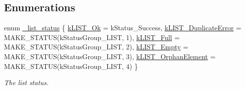 \subsection*{Enumerations}
\begin{DoxyCompactItemize}
\item 
enum \mbox{\hyperlink{group___generic_list_ga803f4a1563b84327f6c4ece67bee52ff}{\+\_\+list\+\_\+status}} \{ \newline
\mbox{\hyperlink{group___generic_list_gga803f4a1563b84327f6c4ece67bee52ffa399f3c85ffa7551e0b398a9549bd0eea}{k\+L\+I\+S\+T\+\_\+\+Ok}} = k\+Status\+\_\+\+Success, 
\mbox{\hyperlink{group___generic_list_gga803f4a1563b84327f6c4ece67bee52ffaba4e0d8373c58275247b212ec1e1cd4b}{k\+L\+I\+S\+T\+\_\+\+Duplicate\+Error}} = M\+A\+K\+E\+\_\+\+S\+T\+A\+T\+US(k\+Status\+Group\+\_\+\+L\+I\+ST, 1), 
\mbox{\hyperlink{group___generic_list_gga803f4a1563b84327f6c4ece67bee52ffaed1e4c08fcd8714e0bf56e65fcd802d5}{k\+L\+I\+S\+T\+\_\+\+Full}} = M\+A\+K\+E\+\_\+\+S\+T\+A\+T\+US(k\+Status\+Group\+\_\+\+L\+I\+ST, 2), 
\mbox{\hyperlink{group___generic_list_gga803f4a1563b84327f6c4ece67bee52ffa5cd6d9d0242b51b6050b3edaccf0db97}{k\+L\+I\+S\+T\+\_\+\+Empty}} = M\+A\+K\+E\+\_\+\+S\+T\+A\+T\+US(k\+Status\+Group\+\_\+\+L\+I\+ST, 3), 
\newline
\mbox{\hyperlink{group___generic_list_gga803f4a1563b84327f6c4ece67bee52ffa57f5f3af2ec503436ce122889f5c8b2a}{k\+L\+I\+S\+T\+\_\+\+Orphan\+Element}} = M\+A\+K\+E\+\_\+\+S\+T\+A\+T\+US(k\+Status\+Group\+\_\+\+L\+I\+ST, 4)
 \}
\begin{DoxyCompactList}\small\item\em The list status. \end{DoxyCompactList}\end{DoxyCompactItemize}
